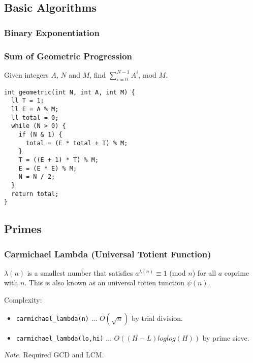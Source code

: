 \subsection{Basic Algorithms}

\subsubsection{Binary Exponentiation}

\subsubsection{Sum of Geometric Progression}

Given integers $A$, $N$ and $M$, find $\displaystyle \sum_{i=0}^{N-1} A^i$, mod $M$.

\begin{lstlisting}
int geometric(int N, int A, int M) {
  ll T = 1;
  ll E = A % M;
  ll total = 0;
  while (N > 0) {
    if (N & 1) {
      total = (E * total + T) % M;
    }
    T = ((E + 1) * T) % M;
    E = (E * E) % M;
    N = N / 2;
  }
  return total;
}
\end{lstlisting}

\subsection{Primes}

\subsubsection{Carmichael Lambda (Universal Totient Function)}

$\lambda(n)$ is a smallest number that satisfies $a^{\lambda(n)} \equiv 1$ (mod $n$)
for all $a$ coprime with $n$. This is also known as an universal totien tunction $\psi(n)$.

Complexity:
\begin{itemize}
  \item \lstinline{carmichael_lambda(n)} ... $O(\sqrt{n})$ by trial division.
  \item \lstinline{carmichael_lambda(lo,hi)} ... $O((H-L) loglog(H))$ by prime sieve.
\end{itemize}

\textit{Note.} Required GCD and LCM.

